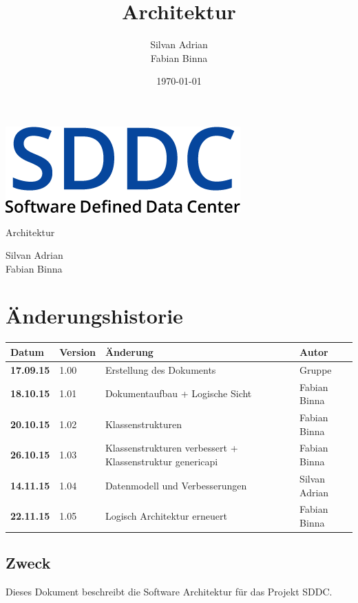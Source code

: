 \documentclass[11pt]{scrartcl}
\title{Architektur}
\author{Silvan Adrian \\ Fabian Binna}
\date{\today{}}
\begin{document}
\def\arraystretch{1.5}
\begin{titlepage}
\begin{center}
\vspace{10em}
\includegraphics[scale=2]{SDDC}
\vspace{10em}
\end{center}
\begin{center}
\huge {Architektur}
\end{center}
\begin{center}
\vspace{10em}
\LARGE {Silvan Adrian} \\
\LARGE {Fabian Binna}
\end{center}

\end{titlepage}

\newpage
\section{Änderungshistorie}
\begin{tabularx}{\linewidth}{l l X l}
\textbf{Datum} & \textbf{Version} & \textbf{Änderung}  & \textbf{Autor} \\
\hline
\textbf{17.09.15} & 1.00 & Erstellung des Dokuments & Gruppe \\
\textbf{18.10.15} & 1.01 & Dokumentaufbau + Logische Sicht & Fabian Binna\\
\textbf{20.10.15} & 1.02 & Klassenstrukturen & Fabian Binna\\
\textbf{26.10.15} & 1.03 & Klassenstrukturen verbessert + Klassenstruktur genericapi & Fabian Binna\\
\textbf{14.11.15} & 1.04 & Datenmodell und Verbesserungen & Silvan Adrian\\
\textbf{22.11.15} & 1.05 & Logisch Architektur erneuert & Fabian Binna\\

\end{tabularx}

\newpage
\tableofcontents
\newpage

\subsection{Zweck}
Dieses Dokument beschreibt die Software Architektur für das Projekt SDDC.
\end{document}
